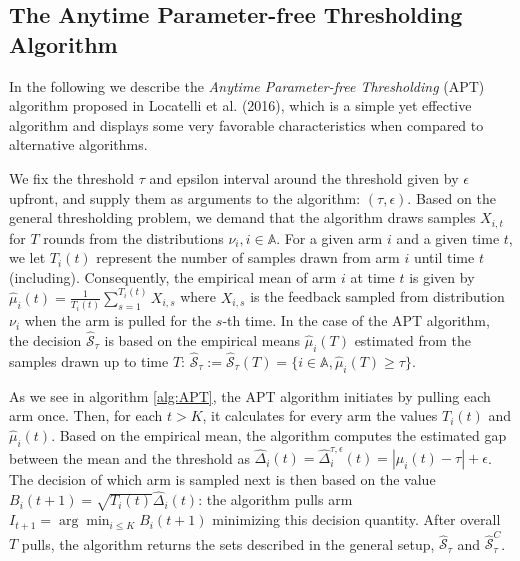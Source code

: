 \documentclass[12pt,]{article}
\begin{document}
\subsection{\texorpdfstring{The Anytime Parameter-free Thresholding
Algorithm
\label{sec:TheAPTAlgorithm}}{The Anytime Parameter-free Thresholding Algorithm }}\label{the-anytime-parameter-free-thresholding-algorithm}

In the following we describe the \emph{Anytime Parameter-free
Thresholding} (APT) algorithm proposed in Locatelli et al. (2016), which
is a simple yet effective algorithm and displays some very favorable
characteristics when compared to alternative algorithms.

We fix the threshold \(\tau\) and epsilon interval around the threshold
given by \(\epsilon\) upfront, and supply them as arguments to the
algorithm: \((\tau, \epsilon)\). Based on the general thresholding
problem, we demand that the algorithm draws samples \(X_{i,t}\) for
\(T\) rounds from the distributions \(\nu_i, i\in \mathbb{A}\). For a
given arm \(i\) and a given time \(t\), we let \(T_i(t)\) represent the
number of samples drawn from arm \(i\) until time \(t\) (including).
Consequently, the empirical mean of arm \(i\) at time \(t\) is given by
\(\hat{\mu}_i(t) = \frac{1}{T_i(t)} \sum_{s=1}^{T_i(t)} X_{i,s}\) where
\(X_{i,s}\) is the feedback sampled from distribution \(\nu_i\) when the
arm is pulled for the \(s\)-th time. In the case of the APT algorithm,
the decision \(\hat{\mathcal{S}}_{\tau}\) is based on the empirical
means \(\hat{\mu}_i(T)\) estimated from the samples drawn up to time
\(T\):
\(\hat{\mathcal{S}}_{\tau} := \hat{\mathcal{S}}_{\tau}(T) = \{i \in \mathbb{A}, \hat{\mu}_i(T) \geq \tau\}\).

As we see in algorithm \ref{alg:APT}, the APT algorithm initiates by
pulling each arm once. Then, for each \(t > K\), it calculates for every
arm the values \(T_i(t)\) and \(\hat{\mu}_i(t)\). Based on the empirical
mean, the algorithm computes the estimated gap between the mean and the
threshold as
\(\hat{\Delta}_i(t) = \hat{\Delta}_i^{\tau, \epsilon}(t) = |\mu_i(t) - \tau| + \epsilon\).
The decision of which arm is sampled next is then based on the value
\(B_i(t+1) = \sqrt{T_i(t)} \hat{\Delta}_i(t)\): the algorithm pulls arm
\(I_{t+1} = \arg \min_{i\leq K} B_i(t+1)\) minimizing this decision
quantity. After overall \(T\) pulls, the algorithm returns the sets
described in the general setup, \(\hat{\mathcal{S}}_{\tau}\) and
\(\hat{\mathcal{S}}^C_{\tau}\).

\IncMargin{1em}
\end{document}
